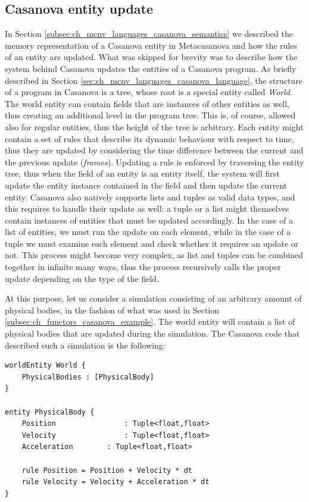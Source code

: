 \subsection{Casanova entity update}
\label{subsec:ch_networking_casanova_update}
In Section \ref{subsec:ch_mcnv_languages_casanova_semantics} we described the memory representation of a Casanova entity in Metacasanova and how the rules of an entity are updated. What was skipped for brevity was to describe how the system behind Casanova updates the entities of a Casanova program. As briefly described in Section \ref{sec:ch_mcnv_languages_casanova_language}, the structure of a program in Casanova is a tree, whose root is a special entity called \textit{World}. The world entity can contain fields that are instances of other entities as well, thus creating an additional level in the program tree. This is, of course, allowed also for regular entities, thus the height of the tree is arbitrary. Each entity might contain a set of rules that describe its dynamic behaviour with respect to time, thus they are updated by considering the time difference between the current and the previous update (\textit{frames}). Updating a rule is enforced by traversing the entity tree, thus when the field of an entity is an entity itself, the system will first update the entity instance contained in the field and then update the current entity. Casanova also natively supports lists and tuples as valid data types, and this requires to handle their update as well: a tuple or a list might themselves contain instances of entities that must be updated accordingly. In the case of a list of entities, we must run the update on each element, while in the case of a tuple we must examine each element and check whether it requires an update or not. This process might become very complex, as list and tuples can be combined together in infinite many ways, thus the process recursively calls the proper update depending on the type of the field.

At this purpose, let us consider a simulation consisting of an arbitrary amount of physical bodies, in the fashion of what was used in Section \ref{subsec:ch_functors_casanova_example}. The world entity will contain a list of physical bodies that are updated during the simulation. The Casanova code that described such a simulation is the following:

\begin{lstlisting}
worldEntity World {
	PhysicalBodies : [PhysicalBody]
}

entity PhysicalBody {
	Position				: Tuple<float,float>
	Velocity				: Tuple<float,float>
	Acceleration		: Tuple<float,float>
	
	rule Position = Position + Velocity * dt
	rule Velocity = Velocity + Acceleration * dt
}
\end{lstlisting}

